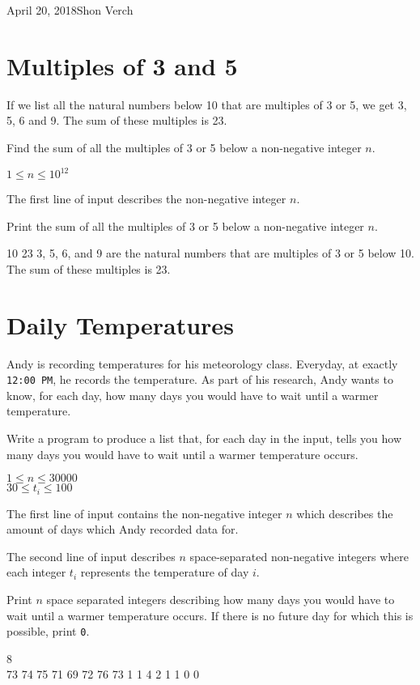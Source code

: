 

             {April 20, 2018}{Shon Verch}


\makeHeader

\section{Multiples of 3 and 5}
If we list all the natural numbers below 10 that are multiples of 3 or 5, we get 3, 5, 6 and 9. The sum of these multiples is 23.

Find the sum of all the multiples of 3 or 5 below a non-negative integer $n$.

\constraints
$1 \leq n \leq 10^{12}$

The first line of input describes the non-negative integer $n$.

\outputformat
Print the sum of all the multiples of 3 or 5 below a non-negative integer $n$.

\addsampleExplanation
{
10
}
{
23
}
{
3, 5, 6, and 9 are the natural numbers that are multiples of 3 or 5 below 10. The sum of these multiples is 23.
}

\newpage\section{Daily Temperatures}
Andy is recording temperatures for his meteorology class. Everyday, at exactly \texttt{12:00 PM}, he records the temperature. As part of his research, Andy wants to know, for each day, how many days you would have to wait until a warmer temperature.

Write a program to produce a list that, for each day in the input, tells you how many days you would have to wait until a warmer temperature occurs.

\constraints
$1 \leq n \leq 30000$\\
$30 \leq t_i \leq 100$

The first line of input contains the non-negative integer $n$ which describes the amount of days which Andy recorded data for.

The second line of input describes $n$ space-separated non-negative integers where each integer $t_i$ represents the temperature of day $i$.

\outputformat
Print $n$ space separated integers describing how many days you would have to wait until a warmer temperature occurs. If there is no future day for which this is possible, print \texttt{0}.

\addsample
{
8\\
73 74 75 71 69 72 76 73
}
{
1 1 4 2 1 1 0 0
}

